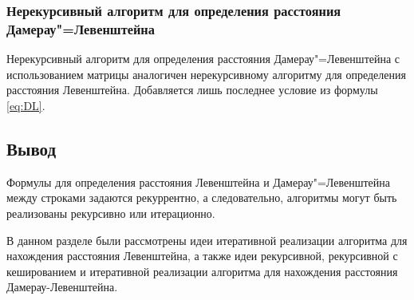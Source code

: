 \subsubsection{Нерекурсивный алгоритм для определения расстояния Дамерау"=Левенштейна}
Нерекурсивный алгоритм для определения расстояния Дамерау"=Левенштейна с использованием матрицы аналогичен нерекурсивному алгоритму для определения расстояния Левенштейна. Добавляется лишь последнее ус\-ловие из формулы \ref{eq:DL}.

\subsection*{Вывод}
Формулы для определения расстояния Левенштейна и Дамерау"=Левенштейна между строками задаются рекуррентно, а следовательно, алгоритмы могут быть реализованы рекурсивно или итерационно.

В данном разделе были рассмотрены идеи итеративной реализации алгоритма для нахождения расстояния Левенштейна, а также идеи рекурсивной, рекурсивной с кешированием и итеративной реализации алгоритма для нахождения расстояния Дамерау-Левенштейна. 
